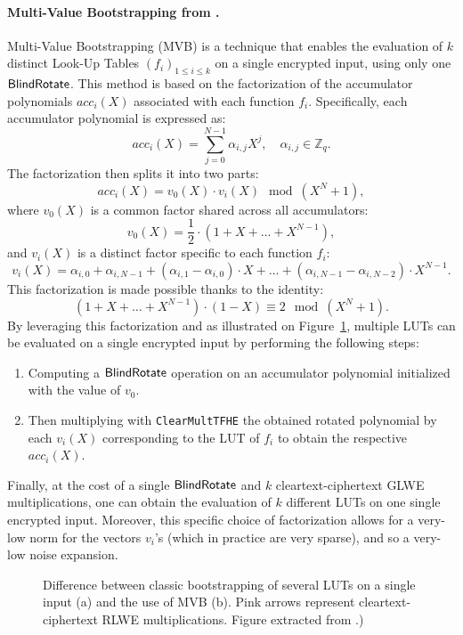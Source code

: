 \paragraph{Multi-Value Bootstrapping from \cite{RSA:CarIzaMol19}.}
\label{primitive:mvb}
%
Multi-Value Bootstrapping (MVB) is a technique that enables the evaluation of $k$ distinct Look-Up Tables $(f_i)_{1 \le i \le k}$ on a single encrypted input, using only one $\sf{BlindRotate}$. This method is based on the factorization of the accumulator polynomials $acc_i(X)$ associated with each function $f_i$. Specifically, each accumulator polynomial is expressed as: 
$$
    acc_i(X) = \sum_{j=0}^{N-1} \alpha_{i,j} X^j, \quad \alpha_{i,j} \in \mathbb{Z}_q.
$$
The factorization then splits it into two parts: 
$$
    acc_i(X) = v_0(X) \cdot v_i(X) \mod (X^N + 1),
$$
where $v_0(X)$ is a common factor shared across all accumulators:
$$
    v_0(X) = \frac{1}{2} \cdot (1 + X + \dots + X^{N-1}),
$$
and $v_i(X)$ is a distinct factor specific to each function $f_i$:
$$
    v_i(X) = \alpha_{i, 0} + \alpha_{i, N-1} + (\alpha_{i, 1} - \alpha_{i, 0}) \cdot X + \dots + (\alpha_{i, N-1} - \alpha_{i, N-2}) \cdot X^{N-1}.
$$
This factorization is made possible thanks to the identity:
$$
(1 + X + \dots + X^{N-1}) \cdot (1-X) \equiv 2 \mod (X^N + 1).
$$
By leveraging this factorization and as illustrated on Figure~\ref{fig:mvb}, multiple LUTs can be evaluated on a single encrypted input by performing the following steps:
\begin{enumerate}
\item Computing a $\sf{BlindRotate}$ operation on an accumulator polynomial initialized with the value of $v_0$.
\item Then multiplying with \texttt{ClearMultTFHE} the obtained rotated polynomial by each $v_i(X)$ corresponding to the LUT of $f_i$ to obtain the respective $acc_i(X)$.
\end{enumerate}
Finally, at the cost of a single $\sf{BlindRotate}$ and $k$ cleartext-ciphertext GLWE multiplications, one can obtain the evaluation of $k$ different LUTs on one single encrypted input. Moreover, this specific choice of factorization allows for a very-low norm for the vectors $v_i$'s (which in practice are very sparse), and so a very-low noise expansion.

\begin{figure}
    \centering
    \caption{Difference between classic bootstrapping of several LUTs on a single input (a) and the use of MVB (b). Pink arrows represent cleartext-ciphertext RLWE multiplications. Figure extracted from \cite{DBLP:conf/wahc/TramaCBS23}.)}
    \label{fig:mvb}
\end{figure}

